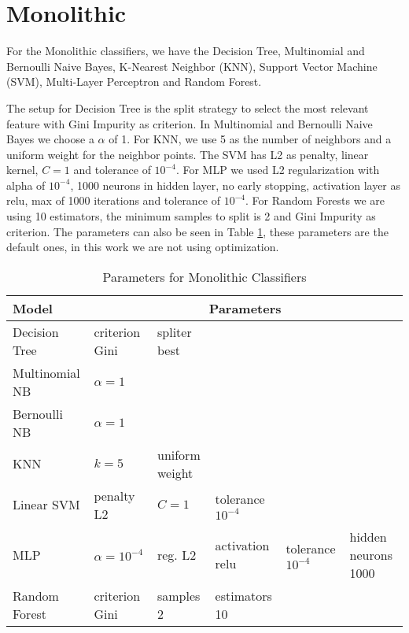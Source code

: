 \section{Monolithic}\label{mono}

For the Monolithic classifiers, we have the Decision Tree, Multinomial and Bernoulli Naive Bayes, K-Nearest Neighbor (KNN), Support Vector Machine (SVM), Multi-Layer Perceptron and Random Forest.

The setup for Decision Tree is the split strategy to select the most relevant feature with Gini Impurity as criterion. In Multinomial and Bernoulli Naive Bayes we choose a $\alpha$ of 1. For KNN, we use 5 as the number of neighbors and a uniform weight for the neighbor points. The SVM has L2 as penalty, linear kernel, $C = 1$ and tolerance of $10^{-4}$. For MLP we used L2 regularization with alpha of $10^{-4}$, 1000 neurons in hidden layer, no early stopping, activation layer as relu, max of 1000 iterations and tolerance of $10^{-4}$. For Random Forests we are using 10 estimators, the minimum samples to split is 2 and Gini Impurity as criterion. The parameters can also be seen in Table \ref{table:monolithic_params}, these parameters are the default ones, in this work we are not using optimization.

\begin{table}[h!]
    \centering
    \renewcommand{\arraystretch}{1.8}
    \begin{tabular}{ p{4cm}p{1.62cm}|p{1.5cm}|p{1.5cm}|p{1.5cm}|p{1.5cm} }
        \toprule
        Model & \multicolumn{5}{c}{Parameters} \\
        \midrule
        Decision Tree & criterion Gini & spliter best & & &\\
        Multinomial NB & $\alpha = 1$ & & & &\\
        Bernoulli NB & $\alpha = 1$ & & & &\\
        KNN & $ k = 5 $ & uniform weight & & &\\
        Linear SVM & penalty L2 & $C = 1$ & tolerance $10^{-4}$ & &\\
        MLP  & $ \alpha = 10^{-4} $ & reg. L2  & activation relu & tolerance $10^{-4}$ & hidden neurons 1000 \\
        Random Forest & criterion Gini & samples 2 & estimators 10 & & \\ [1ex]
        \bottomrule
        \end{tabular}
        \caption{%
        Parameters for Monolithic Classifiers%
        }\label{table:monolithic_params}
\end{table}

